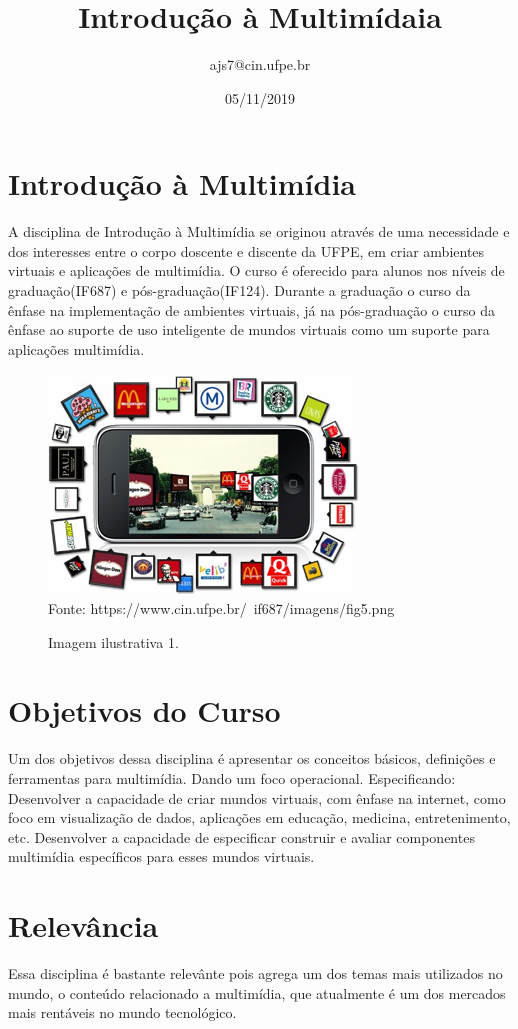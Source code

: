 \documentclass[10pt]{article}
\title{Introdução à Multimídaia}
\author{ajs7@cin.ufpe.br }
\date{05/11/2019}
\begin{document}
\maketitle

\section{Introdução à Multimídia}
A disciplina de Introdução à Multimídia se originou através de uma necessidade e dos interesses entre o corpo doscente e discente da UFPE, em criar ambientes virtuais e aplicações de multimídia.
O curso é oferecido para alunos nos níveis de graduação(IF687) e pós-graduação(IF124).
Durante a graduação o curso da ênfase na implementação de ambientes virtuais, já na pós-graduação o curso da ênfase ao suporte de uso inteligente de mundos virtuais como um suporte para aplicações multimídia.

\begin{figure}[!htb]
    \centering
    \caption{Imagem ilustrativa 1.}
    \includegraphics[scale=1]{imagens/figura.png}\\
    {\footnotesize Fonte: https://www.cin.ufpe.br/~if687/imagens/fig5.png}
    \label{fig:my_label}
\end{figure}

\section{Objetivos do Curso}
Um dos objetivos dessa disciplina é apresentar os conceitos básicos, definições e ferramentas para multimídia. Dando um foco operacional.
Especificando: Desenvolver a capacidade de criar mundos virtuais, com ênfase na internet, como foco em visualização de dados, aplicações em educação, medicina, entretenimento, etc.
Desenvolver a capacidade de especificar construir e avaliar componentes multimídia específicos para esses mundos virtuais.

\section{Relevância}
Essa disciplina é bastante relevânte pois agrega um dos temas mais utilizados no mundo, o conteúdo relacionado a multimídia, que atualmente é um dos mercados mais rentáveis no mundo tecnológico.
\end{document}
